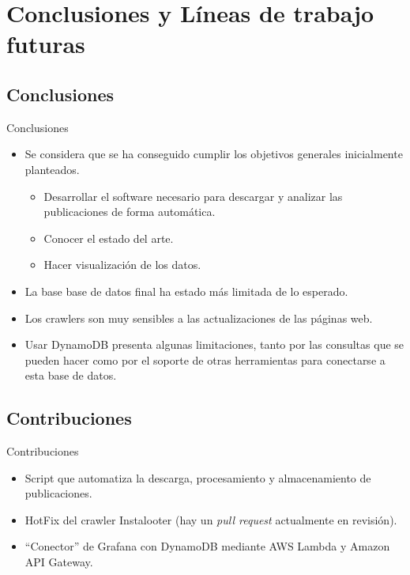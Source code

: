 \documentclass[aspectratio=149]{beamer}
\begin{document}
\section{Conclusiones y Líneas de trabajo futuras}

\subsection{Conclusiones}
\begin{frame}[label=conclu]{Conclusiones}
    \begin{itemize}
        \item Se considera que se ha conseguido cumplir los objetivos generales inicialmente planteados.
        \begin{itemize}
            \item[\rlap{$\square$}{\raisebox{2pt}{\large\hspace{1pt}\ding{51}}}]  Desarrollar el software necesario para descargar y analizar las publicaciones de forma automática.
            \item[\rlap{$\square$}{\raisebox{2pt}{\large\hspace{1pt}\ding{51}}}] Conocer el estado del arte.
            \item[\rlap{$\square$}{\raisebox{2pt}{\large\hspace{1pt}\ding{51}}}] Hacer visualización de los datos.
        \end{itemize}
        \item La base base de datos final ha estado más limitada de lo esperado.
        \item Los crawlers son muy sensibles a las actualizaciones de las páginas web.
        \item Usar DynamoDB presenta algunas limitaciones, tanto por las consultas que se pueden hacer como por el soporte de otras herramientas para conectarse a esta base de datos.
    \end{itemize}
\end{frame}

\subsection{Contribuciones}
\begin{frame}[label=contribuciones]{Contribuciones}
    \begin{itemize}
        \item Script que automatiza la descarga, procesamiento y almacenamiento de publicaciones.
        \item HotFix del crawler Instalooter (hay un \textit{pull request} actualmente en revisión).
        \item ``Conector'' de Grafana con DynamoDB mediante AWS Lambda y Amazon API Gateway.
    \end{itemize}
\end{frame}
\end{document}
